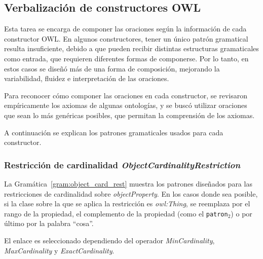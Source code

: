 \subsection{Verbalización de constructores OWL}
\label{sec:verbalizacion_constructores}
Esta tarea se encarga de componer las oraciones según la información de cada constructor OWL.
En algunos constructores, tener un único patrón gramatical resulta insuficiente, debido a que pueden recibir distintas estructuras gramaticales como entrada, que requieren diferentes formas de componerse. Por lo tanto, en estos casos se diseñó más de una forma de composición, mejorando la variabilidad, fluidez e interpretación de las oraciones. 

Para reconocer cómo componer las oraciones en cada constructor, se revisaron empíricamente los axiomas de algunas ontologías, y se buscó utilizar oraciones que sean lo más genéricas posibles, que permitan la comprensión de los axiomas. 

A continuación se explican los patrones gramaticales usados para cada constructor. %

\subsubsection{Restricción de cardinalidad \emph{ObjectCardinalityRestriction}}

La Gramática~\ref{gram:object_card_rest} muestra los patrones diseñados para las restricciones de cardinalidad sobre \emph{objectProperty}. En los casos donde sea posible, si la clase sobre la que se aplica la restricción es \emph{owl:Thing}, se reemplaza por el rango de la propiedad, el complemento de la propiedad (como el {\tt patron$_2$}) o por último por la palabra ``cosa''.

El enlace es seleccionado dependiendo del operador \emph{MinCardinality}, \emph{MaxCardinality} y \emph{ExactCardinality}.

